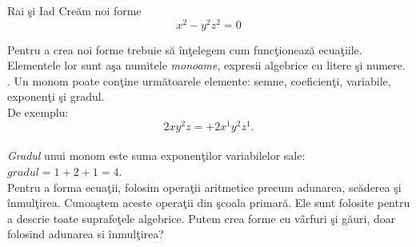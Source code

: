 \begin{surferPage}{Rai \c si Iad}
Cre\u am noi forme \\
\smallskip
\[x^2	- y^2z^2	= 0\]

\singlespacing
Pentru a crea noi forme trebuie s\u a \^in\c telegem cum func\c tioneaz\u a ecua\c tiile. Elementele lor sunt a\c sa numitele {\it monoame},
expresii algebrice cu litere \c si numere.
\singlespacing.
Un monom poate con\c tine urm\u atoarele elemente: semne, coeficien\c ti, variabile, exponen\c ti \c si gradul.\\
\singlespacing
De exemplu: 
\smallskip
\[2xy^2z = +2x^1y^2z^1.\]
\\
\smallskip
{\it Gradul} unui monom este suma exponen\c tilor variabilelor sale: $gradul = 1+2+1=4$.\\
\singlespacing
Pentru a forma ecua\c tii, folosim opera\c tii aritmetice precum adunarea, sc\u aderea \c si \^inmul\c tirea. Cunoa\c stem aceste opera\c tii din 
\c scoala primar\u a. Ele sunt folosite pentru a descrie toate suprafe\c tele algebrice.
\singlespacing
Putem crea forme cu v\^arfuri \c si g\u auri, doar folosind adunarea si \^inmul\c tirea?
\end{surferPage}

